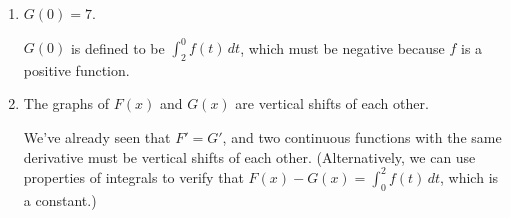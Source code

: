 \documentclass{article}
\begin{document}
\begin{enumerate}
\begin{enumerate}
\begin{enumerate}
      \begin{solution}
        $F(0)$ is defined to be $\displaystyle \int_0^0 f(t)\,dt$, which
        is 0.
      \end{solution}

    \item
      \begin{problem}
        $G(0) = 7$. 
      \end{problem}

      \begin{solution}
        $G(0)$ is defined to be $\displaystyle \int_2^0 f(t)\,dt$, which
        must be negative because $f$ is a positive function. 
      \end{solution}

    \item
      \begin{problem}
        \parbox[t]{3in}{The graphs of $F(x)$ and $G(x)$ are vertical
          shifts of each other.} 
      \end{problem}

      \begin{solution}
        We've already seen that $F' = G'$, and two continuous functions
        with the same derivative must be vertical shifts of each other.
        (Alternatively, we can use properties of integrals to verify that
        $F(x) - G(x) = \displaystyle \int_0^2 f(t)\,dt$, which is a
        constant.)
      \end{solution}

    \end{enumerate}
    \pspace{\vfill}

\end{enumerate}
\end{enumerate}
\end{document}
